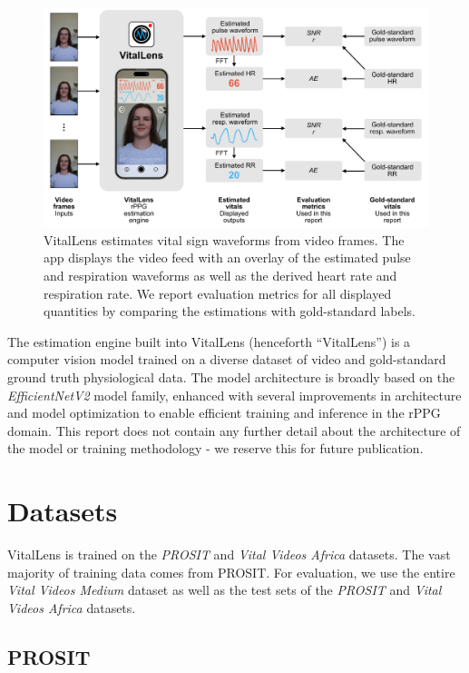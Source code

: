 \documentclass{article}
\begin{document}
\begin{figure}[h!]
	\centering
 	\includegraphics[width=\textwidth]{figures/overview.pdf}
 	\caption{VitalLens estimates vital sign waveforms from video frames. The app displays the video feed with an overlay of the estimated pulse and respiration waveforms as well as the derived heart rate and respiration rate. We report evaluation metrics for all displayed quantities by comparing the estimations with gold-standard labels.}
 	\label{fig:overview}
\end{figure}

The estimation engine built into VitalLens (henceforth ``VitalLens'') is a computer vision model trained on a diverse dataset of video and gold-standard ground truth physiological data.
The model architecture is broadly based on the \textit{EfficientNetV2} \cite{tan2021efficient} model family, enhanced with several improvements in architecture and model optimization to enable efficient training and inference in the rPPG domain.
This report does not contain any further detail about the architecture of the model or training methodology - we reserve this for future publication.

\section{Datasets}
\label{sec:datasets}

VitalLens is trained on the \textit{PROSIT} and \textit{Vital Videos Africa} datasets.
The vast majority of training data comes from PROSIT.
For evaluation, we use the entire \textit{Vital Videos Medium} dataset as well as the test sets of the \textit{PROSIT} and \textit{Vital Videos Africa} datasets.

\subsection{PROSIT}
\end{document}
